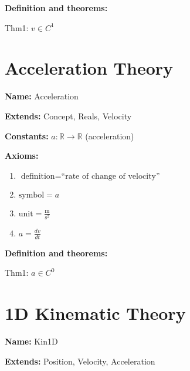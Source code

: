 \documentclass{article}
\begin{document}
\noindent \textbf{Definition and theorems:}

Thm1: $v \in C^1$

\section{Acceleration Theory}

\noindent \textbf{Name:} Acceleration

\noindent \textbf{Extends:} Concept, Reals, Velocity

\noindent \textbf{Constants:} $a: {\mathbb{R} \rightarrow \mathbb{R}}$ (acceleration)

\noindent \textbf{Axioms:}

\begin{enumerate}
    \item $\text{definition} = \text{``rate of change of velocity''}$ 
    \item $\text{symbol} = a$
    \item $\text{unit} = \frac{\text{m}} {\text{s}^2}$
    \item $a = \frac{dv}{dt}$
\end{enumerate}

\noindent \textbf{Definition and theorems:}

Thm1: $a \in C^0$

\section{1D Kinematic Theory}

\noindent \textbf{Name:} Kin1D

\noindent \textbf{Extends:} Position, Velocity, Acceleration



\end{document}
